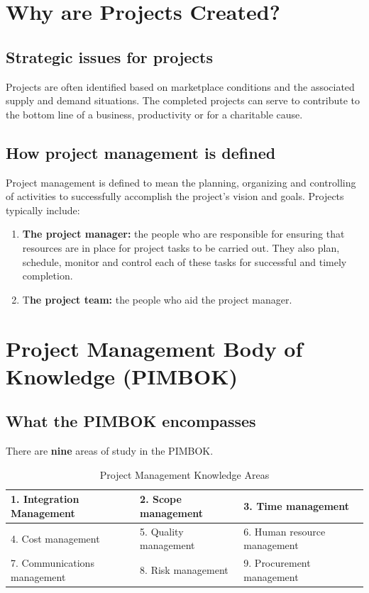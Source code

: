 \documentclass[math,code]{amznotes}
\theoremstyle{remark}
\begin{document}
\section{Why are Projects Created?}
\subsection{Strategic issues for projects}
Projects are often identified based on marketplace conditions and the associated supply and demand situations. The completed projects can serve to contribute to the bottom line of a business, productivity or for a charitable cause.

\subsection{How project management is defined}
Project management is defined to mean the planning, organizing and controlling of activities to successfully accomplish the project's vision and goals. Projects typically include:
\begin{enumerate}
    \item \textbf{The project manager:} the people who are responsible for ensuring that resources are in place for project tasks to be carried out. They also plan, schedule, monitor and control each of these tasks for successful and timely completion.
    \item T\textbf{he project team:} the people who aid the project manager.
\end{enumerate}

\section{Project Management Body of Knowledge (PIMBOK)}
\subsection{What the PIMBOK encompasses}
There are \textbf{nine} areas of study in the PIMBOK.
\begin{table}[h]
    \centering
    \renewcommand{\arraystretch}{1.2}
    \begin{tabular}{|m{4.5cm}|m{4.5cm}|m{4.5cm}|}  %
        \hline
        1. Integration Management & 2. Scope management & 3. Time management \\
        \hline
        4. Cost management & 5. Quality management & 6. Human resource management \\
        \hline
        7. Communications management & 8. Risk management & 9. Procurement management \\
        \hline
    \end{tabular}
    \caption{Project Management Knowledge Areas}
    \label{tab:chapter1-pm-knowledge-areas}
\end{table}
\end{document}
